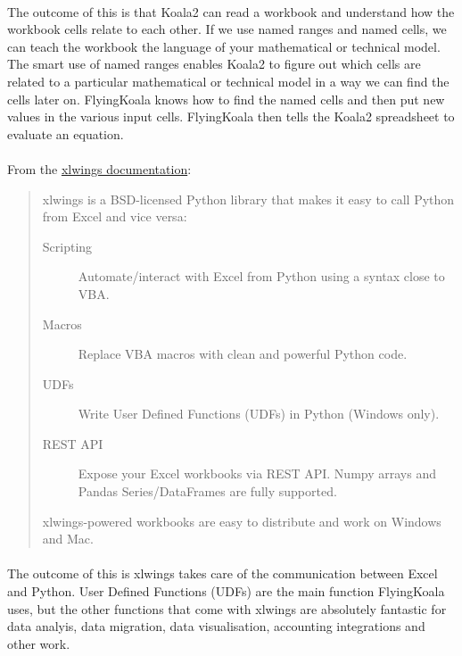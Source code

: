 \documentclass[12pt,a4paper,twoside,openright,titlepage]{article}
\begin{document}
\paragraph{} The outcome of this is that Koala2 can read a workbook and understand how the workbook cells relate to each other. If we use named ranges and named cells, we can teach the workbook the language of your mathematical or technical model. The smart use of named ranges enables Koala2 to figure out which cells are related to a particular mathematical or technical model in a way we can find the cells later on. FlyingKoala knows how to find the named cells and then put new values in the various input cells. FlyingKoala then tells the Koala2 spreadsheet to evaluate an equation.

\paragraph{} From the \href{https://docs.xlwings.org/en/stable/}{xlwings documentation}:

\begin{quotation}
xlwings is a BSD-licensed Python library that makes it easy to call Python from Excel and vice versa:\\

\begin{description}
	\item[Scripting] Automate/interact with Excel from Python using a syntax close to VBA.
	\item[Macros] Replace VBA macros with clean and powerful Python code.
	\item[UDFs] Write User Defined Functions (UDFs) in Python (Windows only).
	\item[REST API] Expose your Excel workbooks via REST API.
Numpy arrays and Pandas Series/DataFrames are fully supported.
\end{description}

xlwings-powered workbooks are easy to distribute and work on Windows and Mac.

\end{quotation}

\paragraph{} The outcome of this is xlwings takes care of the communication between Excel and Python. User Defined Functions (UDFs) are the main function FlyingKoala uses, but the other functions that come with xlwings are absolutely fantastic for data analyis, data migration, data visualisation, accounting integrations and other work.
\end{document}

